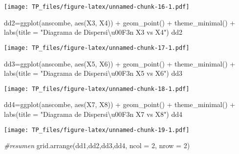 \documentclass[
]{article}
\newenvironment{Shaded}{\begin{snugshade}}{\end{snugshade}}
\newcommand{\AttributeTok}[1]{\textcolor[rgb]{0.77,0.63,0.00}{#1}}
\newcommand{\CommentTok}[1]{\textcolor[rgb]{0.56,0.35,0.01}{\textit{#1}}}
\newcommand{\DecValTok}[1]{\textcolor[rgb]{0.00,0.00,0.81}{#1}}
\newcommand{\FunctionTok}[1]{\textcolor[rgb]{0.00,0.00,0.00}{#1}}
\newcommand{\NormalTok}[1]{#1}
\newcommand{\OtherTok}[1]{\textcolor[rgb]{0.56,0.35,0.01}{#1}}
\newcommand{\SpecialCharTok}[1]{\textcolor[rgb]{0.00,0.00,0.00}{#1}}
\newcommand{\StringTok}[1]{\textcolor[rgb]{0.31,0.60,0.02}{#1}}
\begin{document}
\texttt{[image: TP\_files/figure-latex/unnamed-chunk-16-1.pdf]}

\begin{Shaded}
\begin{Highlighting}[]
\NormalTok{dd2}\OtherTok{=}\FunctionTok{ggplot}\NormalTok{(anscombe, }\FunctionTok{aes}\NormalTok{(X3, X4)) }\SpecialCharTok{+} 
  \FunctionTok{geom\_point}\NormalTok{() }\SpecialCharTok{+} \FunctionTok{theme\_minimal}\NormalTok{() }\SpecialCharTok{+} \FunctionTok{labs}\NormalTok{(}\AttributeTok{title =} \StringTok{"Diagrama de Dispersi\textbackslash{}u00F3n X3 vs X4"}\NormalTok{)}
\NormalTok{dd2}
\end{Highlighting}
\end{Shaded}

\texttt{[image: TP\_files/figure-latex/unnamed-chunk-17-1.pdf]}

\begin{Shaded}
\begin{Highlighting}[]
\NormalTok{dd3}\OtherTok{=}\FunctionTok{ggplot}\NormalTok{(anscombe, }\FunctionTok{aes}\NormalTok{(X5, X6)) }\SpecialCharTok{+} 
  \FunctionTok{geom\_point}\NormalTok{() }\SpecialCharTok{+} \FunctionTok{theme\_minimal}\NormalTok{() }\SpecialCharTok{+} \FunctionTok{labs}\NormalTok{(}\AttributeTok{title =} \StringTok{"Diagrama de Dispersi\textbackslash{}u00F3n X5 vs X6"}\NormalTok{)}
\NormalTok{dd3}
\end{Highlighting}
\end{Shaded}

\texttt{[image: TP\_files/figure-latex/unnamed-chunk-18-1.pdf]}

\begin{Shaded}
\begin{Highlighting}[]
\NormalTok{dd4}\OtherTok{=}\FunctionTok{ggplot}\NormalTok{(anscombe, }\FunctionTok{aes}\NormalTok{(X7, X8)) }\SpecialCharTok{+} 
  \FunctionTok{geom\_point}\NormalTok{() }\SpecialCharTok{+} \FunctionTok{theme\_minimal}\NormalTok{() }\SpecialCharTok{+} \FunctionTok{labs}\NormalTok{(}\AttributeTok{title =} \StringTok{"Diagrama de Dispersi\textbackslash{}u00F3n X7 vs X8"}\NormalTok{)}
\NormalTok{dd4}
\end{Highlighting}
\end{Shaded}

\texttt{[image: TP\_files/figure-latex/unnamed-chunk-19-1.pdf]}

\begin{Shaded}
\begin{Highlighting}[]
\CommentTok{\#resumen}
\FunctionTok{grid.arrange}\NormalTok{(dd1,dd2,dd3,dd4, }\AttributeTok{ncol =} \DecValTok{2}\NormalTok{, }\AttributeTok{nrow =} \DecValTok{2}\NormalTok{)}
\end{Highlighting}
\end{Shaded}
\end{document}
